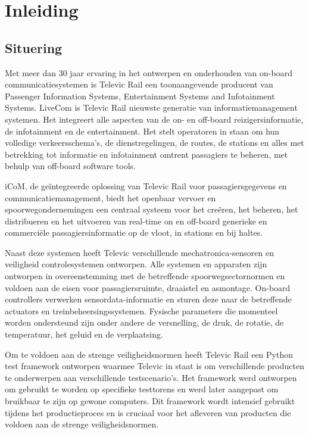 \chapter{Inleiding}\label{hfdst:situering}
\section{Situering}
Met meer dan 30 jaar ervaring in het ontwerpen en onderhouden van on-board communicatiesystemen is Televic Rail een toonaangevende producent van Passenger Information Systems, Entertainment Systems and Infotainment Systems.
LiveCom is Televic Rail nieuwste generatie van informatiemanagement systemen.
Het integreert alle aspecten van de on- en off-board reizigersinformatie, de infotainment en de entertainment. 
Het stelt operatoren in staan om hun volledige verkeersschema's, de dienstregelingen, de routes, de stations en alles met betrekking tot informatie en infotainment omtrent passagiers te beheren, met behulp van off-board software tools.

iCoM, de geïntegreerde oplossing van Televic Rail voor passagiersgegevens en communicatiemanagement, biedt het openbaar vervoer en spoorwegondernemingen een centraal systeem voor het creëren, het beheren, het distribueren en het uitvoeren van real-time on en off-board generieke en commerciële passagiersinformatie op de vloot, in stations en bij haltes.

Naast deze systemen heeft Televic verschillende mechatronica-sensoren en veiligheid controlesystemen ontworpen.
Alle systemen en apparaten zijn ontworpen in overeenstemming met de betreffende spoorwegsectornormen en voldoen aan de eisen voor passagiersruimte, draaistel en asmontage. 
On-board controllers verwerken sensordata-informatie en sturen deze naar de betreffende actuators en treinbeheersingssystemen.
Fysische parameters die momenteel worden ondersteund zijn onder andere de versnelling, de druk, de rotatie, de temperatuur, het geluid en de verplaatsing.

Om te voldoen aan de strenge veiligheidsnormen heeft Televic Rail een Python test framework ontworpen waarmee Televic in staat is om verschillende producten te onderwerpen aan verschillende testscenario's.
Het framework werd ontworpen om gebruikt te worden op specifieke testtorens en werd later aangepast om bruikbaar te zijn op gewone computers.
Dit framework wordt intensief gebruikt tijdens het productieproces en is cruciaal voor het afleveren van producten die voldoen aan de strenge veiligheidsnormen.

